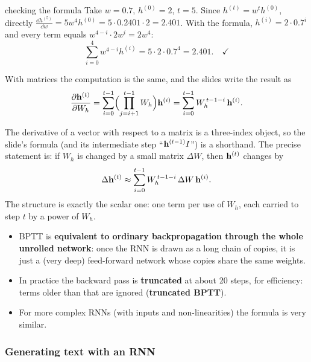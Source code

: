 \begin{nbexample}{checking the formula}
\notinslides
Take $w = 0.7$, $h^{(0)} = 2$, $t = 5$. Since $h^{(t)} = w^t h^{(0)}$, directly
$\frac{\dd h^{(5)}}{\dd w} = 5 w^4 h^{(0)} = 5 \cdot 0.2401 \cdot 2 = 2.401$. With the
formula, $h^{(i)} = 2 \cdot 0.7^i$ and every term equals $w^{4-i} \cdot 2 w^i = 2w^4$:
\[
  \sum_{i=0}^{4} w^{4-i} h^{(i)} = 5 \cdot 2 \cdot 0.7^4 = 2.401 . \quad\checkmark
\]
\end{nbexample}

With matrices the computation is the same, and the slides write the result as
\[
  \frac{\partial \mathbf{h}^{(t)}}{\partial W_h}
  = \sum_{i=0}^{t-1} \Bigl( \prod_{j=i+1}^{t-1} W_h \Bigr) \mathbf{h}^{(i)}
  = \sum_{i=0}^{t-1} W_h^{\,t-1-i}\, \mathbf{h}^{(i)} .
\]

\begin{nbwarning}
The derivative of a vector with respect to a matrix is a three-index object, so the
slide's formula (and its intermediate step ``$\mathbf{h}^{(t-1)} I$'') is a shorthand. The
precise statement is: if $W_h$ is changed by a small matrix $\Delta W$, then
$\mathbf{h}^{(t)}$ changes by
\[
  \Delta \mathbf{h}^{(t)} \approx \sum_{i=0}^{t-1} W_h^{\,t-1-i}\, \Delta W\, \mathbf{h}^{(i)} .
\]
The structure is exactly the scalar one: one term per use of $W_h$, each carried to step
$t$ by a power of $W_h$.
\end{nbwarning}

\begin{itemize}[nosep]
  \item BPTT is \textbf{equivalent to ordinary backpropagation through the whole
        unrolled network}: once the RNN is drawn as a long chain of copies, it is just a
        (very deep) feed-forward network whose copies share the same weights.
  \item In practice the backward pass is \textbf{truncated} at about 20 steps, for
        efficiency: terms older than that are ignored (\textbf{truncated BPTT}).
  \item For more complex RNNs (with inputs and non-linearities) the formula is very
        similar.
\end{itemize}

\subsubsection{Generating text with an RNN}

